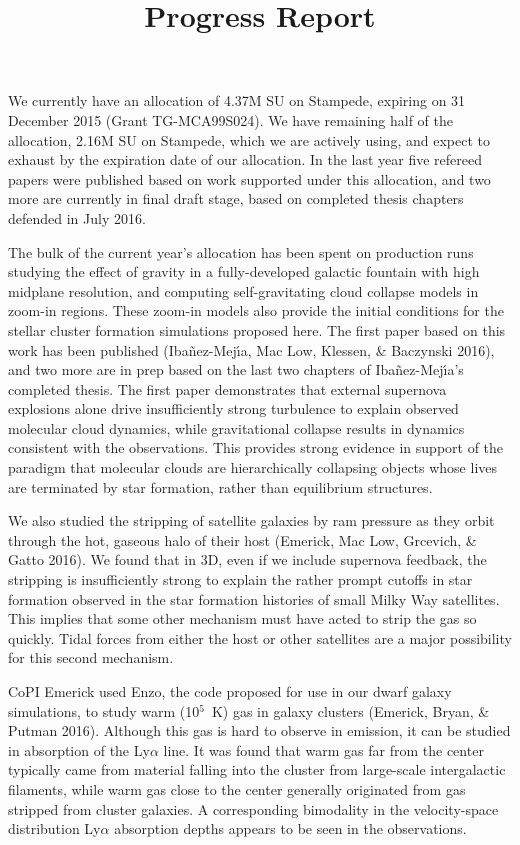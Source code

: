 \documentclass[12pt,preprint]{article}
\title{Progress Report}
\begin{document}
\maketitle
We currently have an allocation of 4.37M SU on Stampede, expiring on 31 December 2015 (Grant TG-MCA99S024).  We have remaining half of the allocation, 2.16M SU on Stampede, which we are actively using, and expect to exhaust by the expiration date of our allocation.  In the last year five refereed papers were published based on work supported under this allocation, and two more are currently in final draft stage, based on completed thesis chapters defended in July 2016.

The bulk of the current year's allocation has been spent on production runs studying the effect of gravity in a fully-developed galactic fountain with high midplane resolution, and computing self-gravitating cloud collapse models in zoom-in regions. These zoom-in models also provide the initial conditions for the stellar cluster formation simulations proposed here. The first paper based on this work has been published (Iba\~nez-Mej\'{\i}a, Mac Low, Klessen, \& Baczynski 2016), and two more are in prep based on the last two chapters of Iba\~nez-Mej\'{\i}a's completed thesis. The first paper demonstrates that external supernova explosions alone drive insufficiently strong turbulence to explain observed molecular cloud dynamics, while gravitational collapse results in dynamics consistent with the observations. This provides strong evidence in support of the paradigm that molecular clouds are hierarchically collapsing objects whose lives are terminated by star formation, rather than equilibrium structures.  

We also studied the stripping of satellite galaxies by ram pressure as they orbit through the hot, gaseous halo of their host (Emerick, Mac Low, Grcevich, \& Gatto 2016). We found that in 3D, even if we include supernova feedback, the stripping is insufficiently strong to explain the rather prompt cutoffs in star formation observed in the star formation histories of small Milky Way satellites.  This implies that some other mechanism must have acted to strip the gas so quickly. Tidal forces from either the host or other satellites are a major possibility for this second mechanism.

CoPI Emerick used Enzo, the code proposed for use in our dwarf galaxy simulations, to study warm (10$^5$~K) gas in galaxy clusters (Emerick, Bryan, \& Putman 2016).  Although this gas is hard to observe in emission, it can be studied in absorption of the Ly$\alpha$ line.  It was found that warm gas far from the center typically came from material falling into the cluster from large-scale intergalactic filaments, while warm gas close to the center generally originated from gas stripped from cluster galaxies.  A corresponding bimodality in the velocity-space distribution Ly$\alpha$ absorption depths appears to be seen in the observations.
\end{document}
